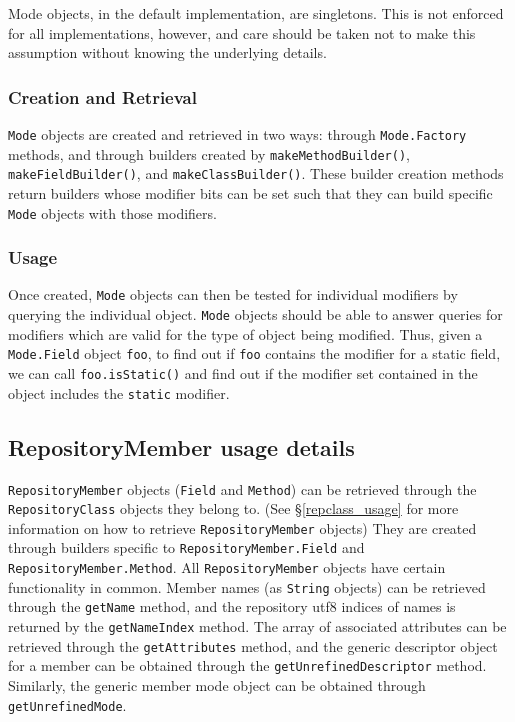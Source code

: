 \documentclass{report}
\begin{document}
Mode objects, in the default implementation, are singletons. This is not 
enforced for all implementations, however, and care should be taken not
to make this assumption without knowing the underlying details.

\subsubsection{Creation and Retrieval}
\texttt{Mode} objects are created and retrieved in two ways: through 
\texttt{Mode.Fac\-tory} methods, and through builders created by
\texttt{make\-Meth\-od\-Build\-er()}, \texttt{make\-Field\-Build\-er()}, and
\texttt{make\-Class\-Build\-er()}. These builder creation methods return
builders whose modifier bits can be set such that they can build
specific \texttt{Mode} objects with those modifiers.

\subsubsection{Usage}

Once created, \texttt{Mode} objects can then be tested for individual
modifiers by querying the individual object. \texttt{Mode} objects should
be able to answer queries for modifiers which are valid for the type
of object being modified. Thus, given a \texttt{Mode.Field} object 
\texttt{foo}, to find out if \texttt{foo} contains the modifier for a
static field, we can call \texttt{foo.isStatic()} and find out if
the modifier set contained in the object includes the \texttt{static}
modifier. 

\subsection{RepositoryMember usage details}

\texttt{Re\-pos\-i\-tory\-Mem\-ber} objects (\texttt{Field} and 
\texttt{Method}) can be retrieved through the \texttt{Re\-pos\-i\-tory\-Class}
objects they belong to. (See \S \ref{repclass_usage} for more information
on how to retrieve \texttt{Re\-pos\-i\-tory\-Mem\-ber} objects) They are 
created through builders specific to \texttt{Re\-pos\-i\-tory\-Mem\-ber.Field} 
and \texttt{Re\-pos\-i\-tory\-Mem\-ber.Meth\-od}. All 
\texttt{Re\-pos\-i\-tory\-Mem\-ber} objects have certain functionality in 
common. Member names (as \texttt{String} objects) can be retrieved through the 
\texttt{getName} method, and the repository utf8 indices of names is returned 
by the \texttt{getNameIndex} method. The array of associated attributes can be 
retrieved through the \texttt{getAttributes} method, and the generic descriptor
object for a member can be obtained through the \texttt{getUnrefinedDescriptor}
method. Similarly, the generic member mode object can be obtained through 
\texttt{getUnrefinedMode}.
\end{document}
